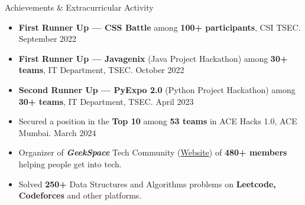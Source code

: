 \documentclass{resume} %
\begin{document}
\begin{rSection}{Achievements \& Extracurricular Activity}
    \begin{itemize}
        \setlength\itemsep{-0.6em}
        \item \textbf{First Runner Up — CSS Battle} among \textbf{100+ participants}, CSI TSEC. \hfill {September 2022}
        \item \textbf{First Runner Up — Javagenix} (Java Project Hackathon) among \textbf{30+ teams}, IT Department, TSEC. \hfill {October 2022}
        \item \textbf{Second Runner Up — PyExpo 2.0} (Python Project Hackathon) among \textbf{30+ teams}, IT Department, TSEC. \hfill {April 2023}
        \item Secured a position in the \textbf{Top 10} among \textbf{53 teams} in ACE Hacks
              1.0, ACE Mumbai. \hfill{March 2024}
        \item Organizer of \textbf{\textit{GeekSpace}} Tech Community
              (\href{https://geekspaceclub.github.io}{Website}) of \textbf{480+ members} helping
              people get into tech.
        \item Solved \textbf{250+} Data Structures and Algorithms problems on
              \textbf{Leetcode, Codeforces} and other platforms.
    \end{itemize}

\end{rSection}

\end{document}
